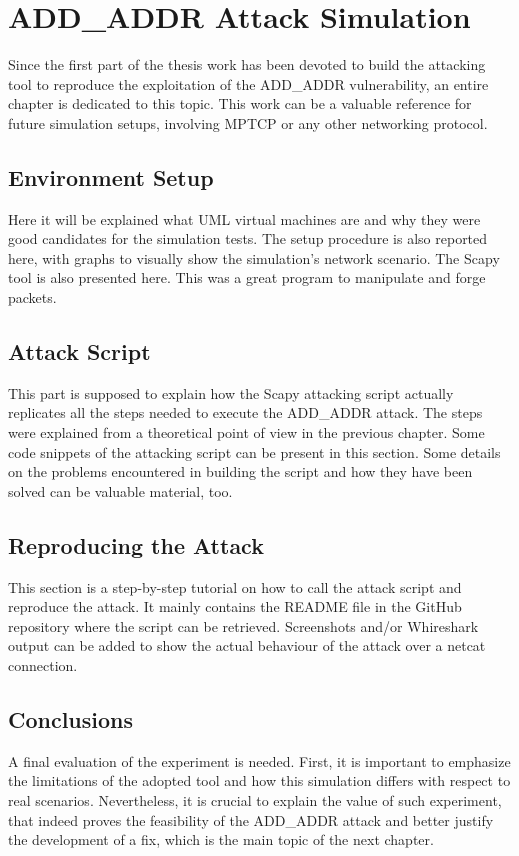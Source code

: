 \chapter{ADD\_ADDR Attack Simulation}
\label{chap:addaddrattackexecution}

Since the first part of the thesis work has been devoted to build the attacking tool to reproduce the exploitation of the ADD\_ADDR vulnerability, an entire chapter is dedicated to this topic. This work can be a valuable reference for future simulation setups, involving MPTCP or any other networking protocol.

\section{Environment Setup}
Here it will be explained what UML virtual machines are and why they were good candidates for the simulation tests. The setup procedure is also reported here, with graphs to visually show the simulation's network scenario. The Scapy tool is also presented here. This was a great program to manipulate and forge packets.

\section{Attack Script}
This part is supposed to explain how the Scapy attacking script actually replicates all the steps needed to execute the ADD\_ADDR attack. The steps were explained from a theoretical point of view in the previous chapter. Some code snippets of the attacking script can be present in this section.
Some details on the problems encountered in building the script and how they have been solved can be valuable material, too.

\section{Reproducing the Attack}
This section is a step-by-step tutorial on how to call the attack script and reproduce the attack. It mainly contains the README file in the GitHub repository where the script can be retrieved.
Screenshots and/or Whireshark output can be added to show the actual behaviour of the attack over a netcat connection.

\section{Conclusions} 
A final evaluation of the experiment is needed. First, it is important to emphasize the limitations of the adopted tool and how this simulation differs with respect to real scenarios. Nevertheless, it is crucial to explain the value of such experiment, that indeed proves the feasibility of the ADD\_ADDR attack and better justify the development of a fix, which is the main topic of the next chapter.

